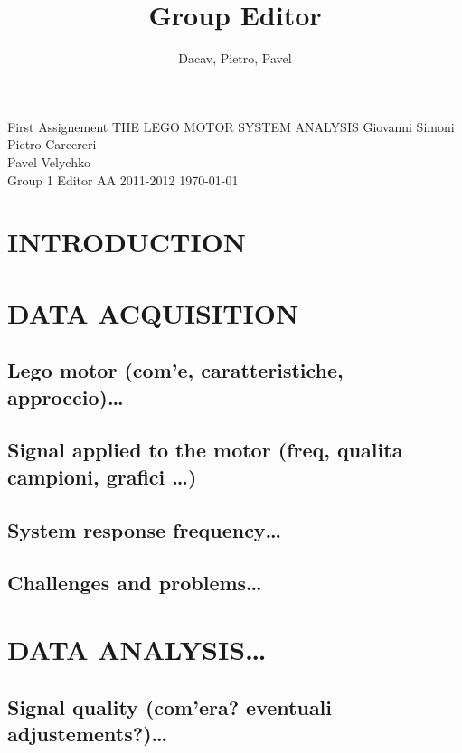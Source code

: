 \documentclass[a4paper,10pt]{book}
\author{Dacav, Pietro, Pavel}
\title{Group Editor}
\begin{document}
\pagestyle{plain}

\begin{center} 

\vskip 4cm
\large {First Assignement}
\vskip 1cm
\huge {THE LEGO MOTOR SYSTEM ANALYSIS}
\vskip 6cm
\large {Giovanni Simoni} \\
\large {Pietro Carcereri} \\
\large {Pavel Velychko} \\
\vskip 3cm
\large {Group 1 Editor}
\vskip 2cm
\vskip 1cm
\large {AA 2011-2012}
\vskip 0.5cm
\today
\end{center}


\parskip 12.0pt

\tableofcontents

\chapter{INTRODUCTION}


\chapter{DATA ACQUISITION} 
\section{Lego motor (com'e, caratteristiche, approccio)\dots}


\section{Signal applied to the motor (freq, qualita campioni, grafici \dots)}


\section{System response frequency\dots}
\section{Challenges and problems\dots}

\chapter{DATA ANALYSIS\dots}
\section{Signal quality (com'era? eventuali adjustements?)\dots}
\end{document}
